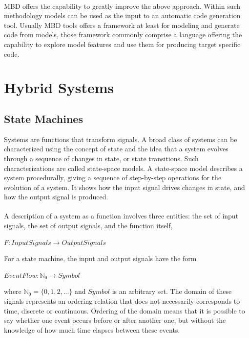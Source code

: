\paragraph{} MBD offers the capability to greatly improve the above approach. Within such methodology models can be used as the input to an automatic code generation tool. Usually MBD tools offers a framework at least for modeling and generate code from models, those framework commonly comprise a language offering the capability to explore model features and use them for producing target specific code.


\section{Hybrid Systems}

\subsection{State Machines}
\label{ssec:statemachines}

Systems are functions that transform signals. A broad class of systems can be characterized using the concept of state and the idea that
a system evolves through a sequence of changes in state, or state transitions. Such characterizations are called state-space models.
A state-space model describes a system procedurally, giving a sequence of step-by-step operations for the evolution of a system. It shows how the input signal drives changes in state, and how the output signal is produced. 
\paragraph{} A description of a system as a function involves three entities: the set of input signals, the set of output signals, and the function itself,
\begin{center}
$F: InputSignals \rightarrow OutputSignals $
\end{center}
For a state machine, the input and output signals have the form
\begin{center}
$EventFlow: \mathbb{N}_{0} \rightarrow Symbol$
\end{center}
where $\mathbb{N}_{0}=\{0,1,2,...\}$ and $Symbol$ is an arbitrary set. The domain of these signals represents an ordering relation that does not necessarily corresponds to time, discrete or continuous. Ordering of the domain means that it is possible to say whether one event occurs before or after another one, but without the knowledge of how much time elapses between these events.
